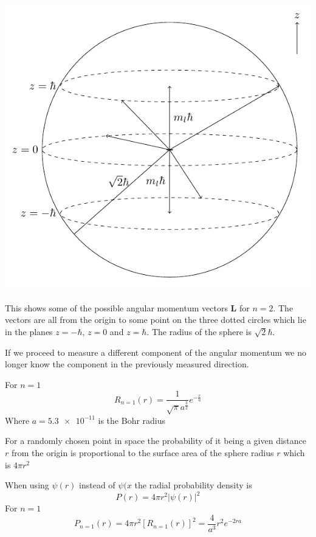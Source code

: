 \documentclass{article}
\renewcommand{\vec}[1]{\bm{#1}}
\newcommand{\vv}[1]{\vec{#1}}
\newcommand{\hb}{\hbar}
\begin{document}
\begin{center}
\includegraphics[scale=0.4]{ElectronAngularMomentum}
\end{center}
This shows some of the possible angular momentum vectors \(\vv L\) for \(n=2\). The vectors are all from the origin to some point on the three dotted circles which lie in the planes \(z=-\hb,\,z=0\) and \(z=\hb\). The radius of the sphere is \(\sqrt 2\hb\).

If we proceed to measure a different component of the angular momentum we no longer know the component in the previously measured direction.

For \(n=1\)
\[R_{n=1}(r)=\frac{1}{\sqrt\pi a^{\frac32}}e^{-\frac ra}\]
Where \(a=\num{5.3e-11}\) is the Bohr radius

For a randomly chosen point in space the probability of it being a given distance \(r\) from the origin is proportional to the surface area of the sphere radius \(r\) which is \(4\pi r^2\)

When using \(\psi(r)\) instead of \(\psi(x\) the radial probability density is
\[P(r)=4\pi r^2|\psi(r)|^2\]
For \(n=1\)
\[P_{n=1}(r)=4\pi r^2[R_{n=1}(r)]^2=\frac{4}{a^3}r^2e^{-2ra}\]
\end{document}
